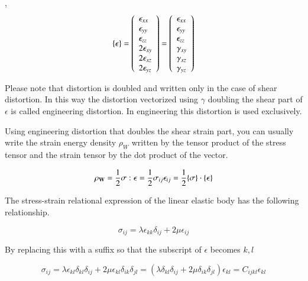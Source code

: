 ,
\begin{equation}
\{\mathbf{\epsilon}\}
=\left(\begin{array}{l}
\epsilon_{xx}\\
\epsilon_{yy}\\
\epsilon_{zz}\\
2\epsilon_{xy}\\
2\epsilon_{xz}\\
2\epsilon_{yz}\end{array}\right)
=\left(\begin{array}{l}
\epsilon_{xx}\\
\epsilon_{yy}\\
\epsilon_{zz}\\
\gamma_{xy}\\
\gamma_{xz}\\
\gamma_{yz}
\end{array}\right)
\end{equation}


Please note that distortion is doubled and written only in the case of shear distortion. In this way the distortion vectorized using $\gamma$ doubling the shear part of $\epsilon$ is called engineering distortion. In engineering this distortion is used exclusively.

Using engineering distortion that doubles the shear strain part, you can usually write the strain energy density $\rho_{W}$ written by the tensor product of the stress tensor and the strain tensor by the dot product of the vector.

\begin{equation}
\rho_{\mathbf{W}}=\frac{1}{2}\mathbf{\sigma}:\mathbf{\epsilon}=\frac{1}{2}\sigma_{ij}\epsilon_{ij}=\frac{1}{2}\{\mathbf{\sigma}\}\cdot\{\mathbf{\epsilon}\}
\end{equation}


The stress-strain relational expression of the linear elastic body has the following relationship.

\begin{equation}
\sigma_{ij}=\lambda\epsilon_{kk}\delta_{ij}+2\mu\epsilon_{ij}
\end{equation}


By replacing this with a suffix so that the subscript of $\epsilon$ becomes $k,l$

\begin{equation}
\sigma_{ij}=\lambda\epsilon_{kl}\delta_{kl}\delta_{ij}+2\mu\epsilon_{kl}\delta_{ik}\delta_{jl}=(\lambda\delta_{kl}\delta_{ij}+2\mu\delta_{ik}\delta_{jl})\epsilon_{kl}=C_{ijkl}\epsilon_{kl}
\end{equation}


